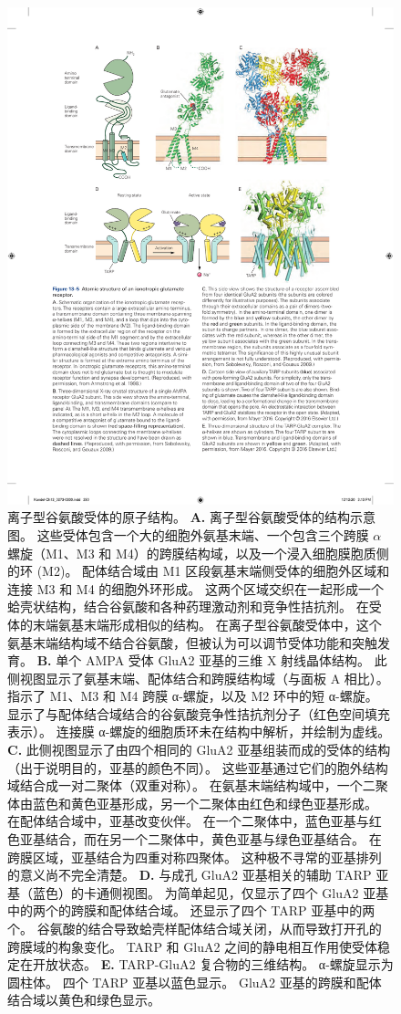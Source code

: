 \begin{figure}[htbp]
	\centering
	\includegraphics[width=0.8\linewidth]{chap13/fig_13_5}
	\caption{离子型谷氨酸受体的原子结构。
		\textbf{A.} 离子型谷氨酸受体的结构示意图。 
		这些受体包含一个大的细胞外氨基末端、一个包含三个跨膜 $\alpha$螺旋（M1、M3 和 M4）的跨膜结构域，以及一个浸入细胞膜胞质侧的环 (M2)。
		配体结合域由 M1 区段氨基末端侧受体的细胞外区域和连接 M3 和 M4 的细胞外环形成。
		这两个区域交织在一起形成一个蛤壳状结构，结合谷氨酸和各种药理激动剂和竞争性拮抗剂。
		在受体的末端氨基末端形成相似的结构。
		在离子型谷氨酸受体中，这个氨基末端结构域不结合谷氨酸，但被认为可以调节受体功能和突触发育\cite{armstrong1998structure}。
		\textbf{B.} 单个 AMPA 受体 GluA2 亚基的三维 X 射线晶体结构。
		此侧视图显示了氨基末端、配体结合和跨膜结构域（与面板 A 相比）。
		指示了 M1、M3 和 M4 跨膜 α-螺旋，以及 M2 环中的短 α-螺旋。
		显示了与配体结合域结合的谷氨酸竞争性拮抗剂分子（红色空间填充表示）。
		连接膜 α-螺旋的细胞质环未在结构中解析，并绘制为虚线\cite{sobolevsky2009x}。
		\textbf{C.} 此侧视图显示了由四个相同的 GluA2 亚基组装而成的受体的结构（出于说明目的，亚基的颜色不同）。
		这些亚基通过它们的胞外结构域结合成一对二聚体（双重对称）。
		在氨基末端结构域中，一个二聚体由蓝色和黄色亚基形成，另一个二聚体由红色和绿色亚基形成。
		在配体结合域中，亚基改变伙伴。
		在一个二聚体中，蓝色亚基与红色亚基结合，而在另一个二聚体中，黄色亚基与绿色亚基结合。
		在跨膜区域，亚基结合为四重对称四聚体。
		这种极不寻常的亚基排列的意义尚不完全清楚\cite{sobolevsky2009x}。
		\textbf{D.} 与成孔 GluA2 亚基相关的辅助 TARP 亚基（蓝色）的卡通侧视图。
		为简单起见，仅显示了四个 GluA2 亚基中的两个的跨膜和配体结合域。
		还显示了四个 TARP 亚基中的两个。
		谷氨酸的结合导致蛤壳样配体结合域关闭，从而导致打开孔的跨膜域的构象变化。
		TARP 和 GluA2 之间的静电相互作用使受体稳定在开放状态\cite{mayer2016structural}。 
		\textbf{E.} TARP-GluA2 复合物的三维结构。
		α-螺旋显示为圆柱体。
		四个 TARP 亚基以蓝色显示。
		GluA2 亚基的跨膜和配体结合域以黄色和绿色显示\cite{mayer2016structural}。}
	\label{fig:13_5}
\end{figure}


